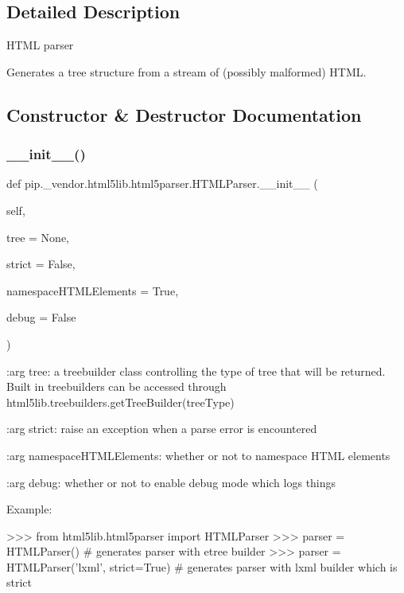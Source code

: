 \subsection{Detailed Description}
\begin{DoxyVerb}HTML parser

Generates a tree structure from a stream of (possibly malformed) HTML.\end{DoxyVerb}
 

\subsection{Constructor \& Destructor Documentation}
\mbox{\label{classpip_1_1__vendor_1_1html5lib_1_1html5parser_1_1HTMLParser_ad9b0cd5d2f6a8f940f4efc6b6124c9be}} 
\subsubsection{\texorpdfstring{\+\_\+\+\_\+init\+\_\+\+\_\+()}{\_\_init\_\_()}}
{\footnotesize\ttfamily def pip.\+\_\+vendor.\+html5lib.\+html5parser.\+H\+T\+M\+L\+Parser.\+\_\+\+\_\+init\+\_\+\+\_\+ (\begin{DoxyParamCaption}\item[{}]{self,  }\item[{}]{tree = {\ttfamily None},  }\item[{}]{strict = {\ttfamily False},  }\item[{}]{namespace\+H\+T\+M\+L\+Elements = {\ttfamily True},  }\item[{}]{debug = {\ttfamily False} }\end{DoxyParamCaption})}

\begin{DoxyVerb}:arg tree: a treebuilder class controlling the type of tree that will be
    returned. Built in treebuilders can be accessed through
    html5lib.treebuilders.getTreeBuilder(treeType)

:arg strict: raise an exception when a parse error is encountered

:arg namespaceHTMLElements: whether or not to namespace HTML elements

:arg debug: whether or not to enable debug mode which logs things

Example:

>>> from html5lib.html5parser import HTMLParser
>>> parser = HTMLParser()                     # generates parser with etree builder
>>> parser = HTMLParser('lxml', strict=True)  # generates parser with lxml builder which is strict\end{DoxyVerb}
 

